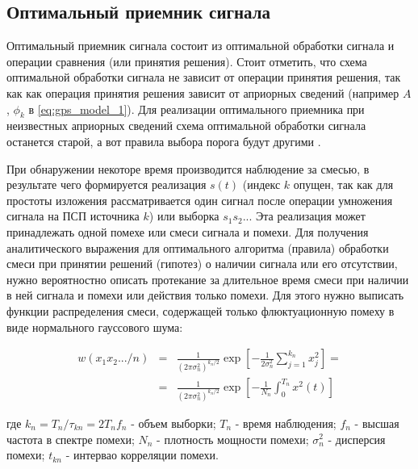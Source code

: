 \subsection{Оптимальный приемник сигнала}

Оптимальный приемник сигнала состоит из оптимальной обработки сигнала и операции сравнения (или принятия решения). Стоит отметить,
что схема оптимальной обработки сигнала не зависит от операции принятия решения, так как как операция принятия решения зависит от
априорных сведений (например $A$, $\phi_k$ в \ref{eq:gps_model_1}). Для реализации оптимального приемника при неизвестных априорных
сведений схема оптимальной обработки сигнала останется старой, а вот правила выбора порога будут другими \cite{pestryakov-book}.

При обнаружении некоторе время производится наблюдение за смесью, в результате чего формируется реализация $s(t)$ (индекс $k$
опущен, так как для простоты изложения рассматривается один сигнал после операции умножения сигнала на ПСП источника $k$) или
выборка $s_{1}s_{2}...$ Эта реализация может принадлежать одной помехе или смеси сигнала и помехи. Для получения аналитического
выражения для оптимального алгоритма (правила) обработки смеси при принятии решений (гипотез) о наличии сигнала или его отсутствии,
нужно вероятностно описать протекание за длительное время смеси при наличии в ней сигнала и помехи или действия только помехи. Для
этого нужно выписать функции распределения смеси, содержащей только флюктуационную помеху в виде нормального гауссового шума:

\begin{center}
\begin{eqnarray}
	\label{eq:just_noise}
	w(x_{1}x_{2}.../n) & = & \frac{1}{(2\pi\sigma_{n}^{2})^{k_n/2}}\exp[-\frac{1}{2\sigma_{n}^{2}}\sum_{j=1}^{k_n}x_{j}^2] = \\
			& = & \frac{1}{(2\pi\sigma_{n}^{2})^{k_n/2}}\exp[-\frac{1}{N_n}\int_{0}^{T_n}x^2(t)] \nonumber
\end{eqnarray}
\end{center}
где $k_n=T_n/\tau_{kn}=2T_nf_{n}$ - объем выборки; ${T_n}$ - время наблюдения; ${f_{n}}$ - высшая частота в спектре помехи;
${N_n}$ - плотность мощности помехи; ${\sigma_{n}^{2}}$ - дисперсия помехи; ${t_{kn}}$ - интервао корреляции помехи.

